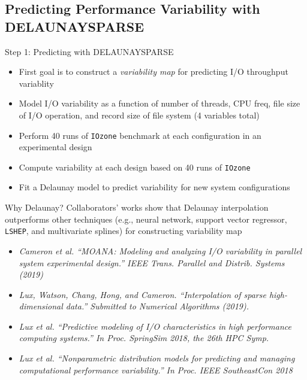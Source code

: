 \documentclass[xcolor=dvipsnames]{beamer}
\begin{document}
\subsection{Predicting Performance Variability with DELAUNAYSPARSE}
\begin{frame}{Step 1: Predicting with DELAUNAYSPARSE}
\begin{itemize}
\item First goal is to construct a {\it variability map} for predicting
I/O throughput variablity
\item Model I/O variability as a function of number of threads, CPU freq,
file size of I/O operation, and record size of file system (4 variables total)
\item Perform 40 runs of {\tt IOzone} benchmark at each configuration in an
experimental design
\item Compute variability at each design based on 40 runs of {\tt IOzone}
\item Fit a Delaunay model to predict variability for new system
configurations
\end{itemize}
\end{frame}
\begin{frame}{Why Delaunay?}
Collaborators' works show that Delaunay interpolation outperforms
other techniques (e.g., neural network, support vector regressor,
{\tt LSHEP}, and multivariate splines) for constructing variability map
\begin{itemize}
\item
{\it \small Cameron et al. ``MOANA: Modeling and analyzing I/O variability in
parallel system experimental design.'' IEEE Trans. Parallel and Distrib. Systems
(2019)}
\item
{\it \small Lux, Watson, Chang, Hong, and Cameron.
``Interpolation of sparse high-dimensional data.''
Submitted to Numerical Algorithms (2019).}
\item
{\it \small Lux et al.
``Predictive modeling of I/O characteristics in high performance
computing systems.''
In Proc. SpringSim 2018, the 26th HPC Symp.}
\item
{\it \small Lux et al.
``Nonparametric distribution models for predicting and managing computational
performance variability.''
In Proc. IEEE SoutheastCon 2018}
\end{itemize}
\end{frame}
\end{document}
